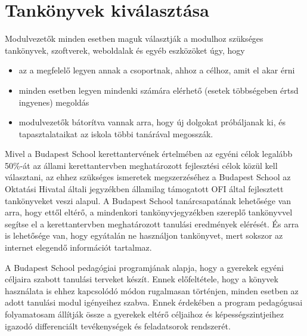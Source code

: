 \section{Tankönyvek kiválasztása}



Modulvezetők minden esetben maguk választják a modulhoz szükséges
tankönyvek, szoftverek, weboldalak és egyéb eszközöket úgy, hogy

\begin{itemize}

      \item
            az a megfelelő legyen annak a csoportnak, ahhoz a célhoz, amit el
            akar
            érni
      \item
            minden esetben legyen mindenki számára elérhető (esetek többségeben
            értsd ingyenes) megoldás
      \item
            modulvezetők bátorítva vannak arra, hogy új dolgokat próbáljanak
            ki,
            és tapasztalataikat az iskola többi tanárával megosszák.
\end{itemize}

Mivel a Budapest School kerettantervének értelmében az egyéni célok
legalább 50\%-át az állami kerettantervben meghatározott fejlesztési
célok közül kell választani, az ehhez szükséges ismeretek megszerzéséhez
a Budapest School az Oktatási Hivatal általi jegyzékben államilag
támogatott OFI által fejlesztett tankönyveket veszi alapul. A Budapest
School tanárcsapatának lehetősége van arra, hogy ettől eltérő, a
mindenkori tankönyvjegyzékben szereplő tankönyvvel segítse el a
kerettantervben meghatározott tanulási eredmények elérését. És arra is
lehetősége van, hogy egyátalán ne használjon tankönyvet, mert sokszor az
internet elegendő információt tartalmaz.

A Budapest School pedagógiai programjának alapja, hogy a gyerekek egyéni
céljaira szabott tanulási terveket készít. Ennek előfeltétele, hogy a
könyvek használata is ehhez kapcsolódó módon rugalmasan történjen,
minden esetben az adott tanulási modul igényeihez szabva. Ennek
érdekében a program pedagógusai folyamatosam állítják össze a gyerekek
eltérő céljaihoz és képességszintjeihez igazodó differenciált
tevékenységek és feladatsorok rendszerét.
